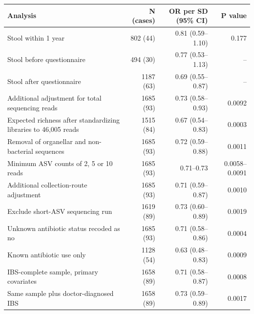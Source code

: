 \begin{tabular}{>{\raggedright\arraybackslash}p{}rrr}
\toprule
Analysis & N (cases) & OR per SD (95\% CI) & P value \\
\midrule
Stool within 1 year & 802 (44) & 0.81 (0.59--1.10) & 0.177 \\
Stool before questionnaire & 494 (30) & 0.77 (0.53--1.13) & -- \\
Stool after questionnaire & 1187 (63) & 0.69 (0.55--0.87) & -- \\
Additional adjustment for total sequencing reads & 1685 (93) & 0.73 (0.58--0.93) & 0.0092 \\
Expected richness after standardizing libraries to 46,005 reads & 1515 (84) & 0.67 (0.54--0.83) & 0.0003 \\
Removal of organellar and non-bacterial sequences & 1685 (93) & 0.72 (0.59--0.88) & 0.0011 \\
Minimum ASV counts of 2, 5 or 10 reads & 1685 (93) & 0.71--0.73 & 0.0058--0.0091 \\
Additional collection-route adjustment & 1685 (93) & 0.71 (0.59--0.87) & 0.0010 \\
Exclude short-ASV sequencing run & 1619 (89) & 0.73 (0.60--0.89) & 0.0019 \\
Unknown antibiotic status recoded as no & 1685 (93) & 0.71 (0.58--0.86) & 0.0004 \\
Known antibiotic use only & 1128 (54) & 0.63 (0.48--0.83) & 0.0009 \\
IBS-complete sample, primary covariates & 1658 (89) & 0.71 (0.58--0.87) & 0.0008 \\
Same sample plus doctor-diagnosed IBS & 1658 (89) & 0.73 (0.59--0.89) & 0.0017 \\
\bottomrule
\end{tabular}
